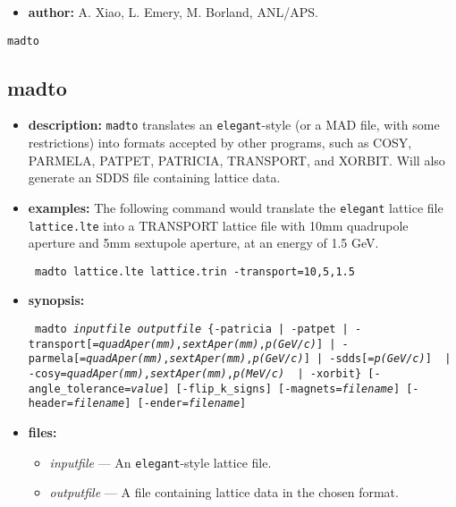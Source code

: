 \documentclass[11pt]{article}
\begin{document}
\begin{itemize}
\item {\bf author:} A. Xiao, L. Emery, M. Borland, ANL/APS.
\end{itemize}

\newpage
\begin{center}{\Large\verb|madto|}\end{center}
\subsection{madto}
\label{madto}

\begin{itemize}
\item {\bf description:} 
\verb|madto| translates an {\tt elegant}-style (or a MAD file, with
some restrictions) into formats accepted by other programs, such as COSY,
PARMELA, PATPET, PATRICIA, TRANSPORT, and XORBIT.  Will also generate
an SDDS file containing lattice data.

\item {\bf examples:}
The following command would translate the {\tt elegant} lattice file 
\verb|lattice.lte| into a TRANSPORT lattice file with 10mm quadrupole
aperture and 5mm sextupole aperture, at an energy of 1.5 GeV.
\begin{flushleft}{\tt
madto lattice.lte lattice.trin -transport=10,5,1.5
}\end{flushleft}

\item {\bf synopsis:}
\begin{flushleft}{\tt
madto {\em inputfile} {\em outputfile}
 \{-patricia | -patpet | -transport[={\em quadAper(mm)},{\em sextAper(mm)},{\em p(GeV/c)}]
            | -parmela[={\em quadAper(mm)},{\em sextAper(mm)},{\em p(GeV/c)}]
            | -sdds[={\em p(GeV/c)}] \
            | -cosy={\em quadAper(mm)},{\em sextAper(mm)},{\em p(MeV/c)} \
            | -xorbit\}
 [-angle\_tolerance={\em value}] [-flip\_k\_signs] [-magnets={\em filename}]
 [-header={\em filename}] [-ender={\em filename}]
}\end{flushleft}

\item {\bf files:}
\begin{itemize}
\item {\em inputfile} --- An {\tt elegant}-style lattice file.
\item {\em outputfile} --- A file containing lattice data in the chosen format.
\end{itemize}


\end{itemize}
\end{document}
